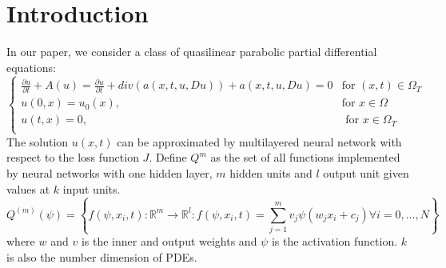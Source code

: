 \documentclass{article}
\begin{document}
	\tableofcontents
	\section{Introduction}

	In our paper, we consider a class of quasilinear parabolic partial differential equations:
	\begin{equation}
	\begin{cases}
 \frac{\partial u}{\partial t} +A(u) =\frac{\partial u}{\partial t}+div(a(x,t,u,Du))+a(x,t,u,Du)=0 & \text{for $(x,t) \in \Omega_{T}$}\\
u(0,x) = u_{0}(x), & \text{for $x \in \Omega$} \\
u(t,x) = 0, & \text{ for $x \in \Omega_{T}$} \\
	\end{cases}
	\label{eq:cauchy}
	\end{equation}
	The solution $u(x,t)$ can be approximated by multilayered neural network with respect to the loss function $J$. Define $Q^{m}$ as the set of all functions implemented by neural networks with one hidden layer, $m$ hidden units and $\textit{l}$ output unit given values at $k$ input units.
	\begin{equation}
	Q^{(m)}(\psi)=\left \lbrace f(\psi,x_i,t): \mathbb{R}^{m} \rightarrow \mathbb{R}^{\textit{l}}:  f(\psi,x_i,t) = \sum_{j=1}^{m}v_{j}\psi(w_{j}x_{i} + c_j ) \forall i = 0, \dots, N \right\rbrace
	\label{eq:nn}
	\end{equation}
	where $w$ and $v$ is the inner and output weights and $\psi$ is the activation function. $k$ is also the number dimension of PDEs.
\end{document}
